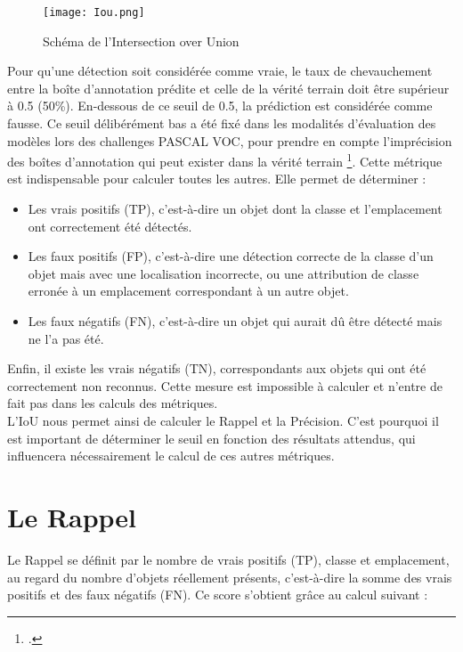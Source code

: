 \documentclass[12pt,twoside]{book}
\begin{document}
\begin{figure}[ht]
    \centering
    \begin{minipage}[b]{0.45\textwidth}
        \centering
        \texttt{[image: Iou.png]}
        \caption{Schéma de l'Intersection over Union}
    \end{minipage}
\end{figure}

Pour qu'une détection soit considérée comme vraie, le taux de chevauchement entre la boîte d’annotation prédite et celle de la vérité terrain doit être supérieur à 0.5 (50\%). En-dessous de ce seuil de 0.5, la prédiction est considérée comme fausse. Ce seuil délibérément bas a été fixé dans les modalités d’évaluation des modèles lors des challenges PASCAL VOC, pour prendre en compte l’imprécision des boîtes d’annotation qui peut exister dans la vérité terrain \footcite[314]{everingham_pascal_2010}.
Cette métrique est indispensable pour calculer toutes les autres. Elle permet de déterminer : \\

\begin{itemize}
    \item Les vrais positifs (TP), c’est-à-dire un objet dont la classe et l’emplacement ont correctement été détectés.
    \item Les faux positifs (FP), c’est-à-dire une détection correcte de la classe d'un objet mais avec une localisation incorrecte, ou une attribution de classe erronée à un emplacement correspondant à un autre objet.
    \item Les faux négatifs (FN), c’est-à-dire un objet qui aurait dû être détecté mais ne l’a pas été.
\end{itemize}

Enfin, il existe les vrais négatifs (TN), correspondants aux objets qui ont été correctement non reconnus. Cette mesure est impossible à calculer et n’entre de fait pas dans les calculs des métriques.\\

L’IoU nous permet ainsi de calculer le Rappel et la Précision. C’est pourquoi il est important de déterminer le seuil en fonction des résultats attendus, qui influencera nécessairement le calcul de ces autres métriques.

\section{Le Rappel}

Le Rappel se définit par le nombre de vrais positifs (TP), classe et emplacement, au regard du nombre d’objets réellement présents, c’est-à-dire la somme des vrais positifs et des faux négatifs (FN). Ce score s’obtient grâce au calcul suivant :
\end{document}

